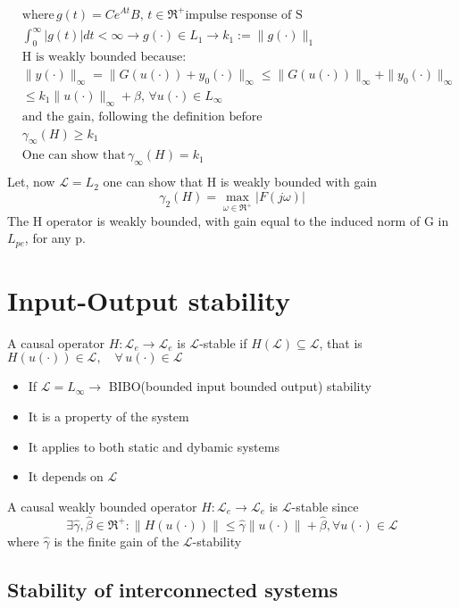 \[\begin{aligned}
	&\text{where} 	\, g(t)=Ce^{At}B, \, t\in \Re^+ \text{impulse response of S}\\
	&\int_{0}^{\infty}|g(t)|dt<\infty\to g(\cdot)\in L_1 \to k_1 := \|g(\cdot)\|_1\\
	&\text{H is weakly bounded because:}\\
	&\|y(\cdot)\|_{\infty}=\|G(u(\cdot))+y_0(\cdot)\|_{\infty}\le\|G(u(\cdot))\|_{\infty}+\|y_0(\cdot)\|_{\infty}\\
	&\le k_1\|u(\cdot)\|_{\infty}+\beta,\, \forall u(\cdot) \in L_{\infty}\\
	&\text{and the gain, following the definition before}\\
	&\gamma_{\infty}(H)\ge k_1\\
	&\text{One can show that} \, \gamma_{\infty}(H)=k_1\\
\end{aligned}
\]Let, now $\boxed{\mathcal{L}=L_2}$ one can show that H is weakly bounded with gain \[\gamma_2(H)=\max_{\omega\in\Re^+}|F(j\omega)|\] The H operator is weakly bounded, with gain equal to the induced norm of G in $L_{pe}$, for any p.
\section{Input-Output stability}
\begin{defn}
	A causal operator $H:\mathcal{L}_e\to\mathcal{L}_e$ is $\mathcal{L}$-stable if $H(\mathcal{L})\subseteq\mathcal{L}$, that is $H(u(\cdot))\in\mathcal{L},\quad \forall \, u(\cdot)\in\mathcal{L}$
	\begin{itemize}
		\item If $\mathcal{L}=L_{\infty}\to$ BIBO(bounded input bounded output) stability
		\item It is a property of the system
		\item It applies to both static and dybamic systems
		\item It depends on $\mathcal{L}$
	\end{itemize}
\end{defn}
\begin{thm}
	A causal weakly bounded operator $H:\mathcal{L}_e\to\mathcal{L}_e$ is $\mathcal{L}$-stable since 
	\[
	\exists \hat{\gamma},\hat{\beta}\in\Re^+:\|H(u(\cdot))\|\le\hat{\gamma}\|u(\cdot)\|+\hat{\beta},\forall u(\cdot)\in\mathcal{L}
	\]where $\hat{\gamma}$ is the finite gain of the $\mathcal{L}$-stability
\end{thm}
\subsection{Stability of interconnected systems}
